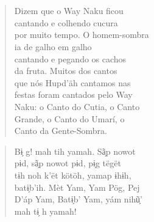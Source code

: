 \chapter*{}

\mbox{}\vspace*{\fill}

\begin{verse}
Dizem que o Way Naku ficou\\
cantando e colhendo cucura\\
por muito tempo. O homem-sombra\\
ia de galho em galho\\
cantando e pegando os cachos\\
da fruta. Muitos dos cantos\\
que nós Hupd’äh cantamos nas\\
festas foram cantados pelo Way\\
Naku: o Canto do Cutia, o Canto\\
Grande, o Canto do Umarí, o\\
Canto da Gente-Sombra.
\end{verse}

\begin{verse}
Bɨ̗ g! mah tih yamah. Sã̗p nowot\\
pɨd, sã̗p nowot pɨd, pɨ̗g tëgët\\
tɨh noh k’ët kötöh, yamap ɨhɨh,\\
batɨ̗b’ih. Mèt Yam, Yam Pög, Pej\\
D’áp Yam, Batɨ̗b’ Yam, yám nihũ̗’\\
mah tɨ̗ h yamah!
\end{verse}

\vspace*{\fill}

